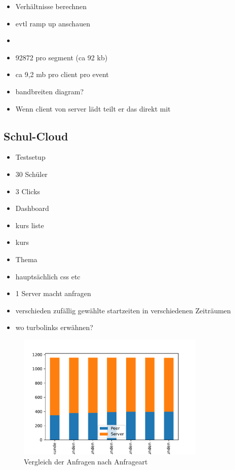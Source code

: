 

\begin{itemize}
	\item Verhältnisse berechnen
	\item evtl ramp up anschauen
	\item  
\end{itemize}

\begin{itemize}
	\item 92872 pro segment (ca 92 kb) 
	\item ca 9,2 mb pro client pro event
	\item bandbreiten diagram? 
	\item Wenn client von server lädt teilt er das direkt mit
\end{itemize}

\subsection{Schul-Cloud}

\begin{itemize}
	\item Testsetup
	\item 30 Schüler
	\item 3 Clicks
	\item Dashboard
	\item kurs liste
	\item kurs
	\item Thema
	\item hauptsächlich css etc
	\item 1 Server macht anfragen
	\item verschieden zufällig gewählte startzeiten in verschiedenen Zeiträumen
	\item wo turbolinks erwähnen?
\end{itemize}
\begin{figure}[!h]
	\centering
	\includegraphics[width=0.8\textwidth]{figures/sc_stacked_interval}
	\caption[A Figure Short-Title]{Vergleich der Anfragen nach Anfrageart}
	\label{fig:15_clients_network}
\end{figure}

